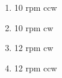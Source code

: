 \documentclass[journal]{IEEEtran}
\begin{document}
\begin{enumerate}
\begin{figure}[!ht]
    \centering
    \label{fig:shaft}
    \end{figure}
\begin{enumerate}
    \item  10 rpm ccw
    \item  10 rpm cw
    \item  12 rpm cw
    \item  12 rpm ccw
  \end{enumerate}
\end{enumerate}

\end{document}

